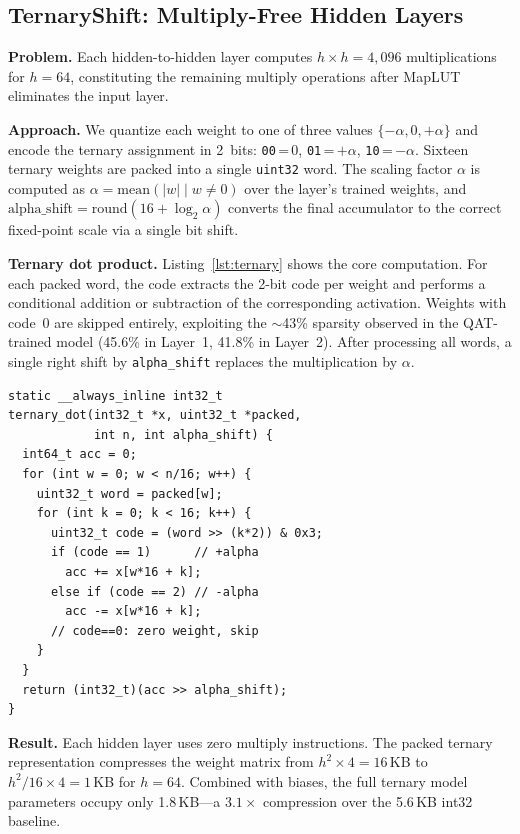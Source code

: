 \documentclass[sigconf,nonacm]{acmart}
\begin{document}
\subsection{TernaryShift: Multiply-Free Hidden Layers}\label{sec:ternary}

\textbf{Problem.}
Each hidden-to-hidden layer computes $h \times h = 4{,}096$
multiplications for $h = 64$, constituting the remaining multiply
operations after MapLUT eliminates the input layer.

\textbf{Approach.}
We quantize each weight to one of three values
$\{-\alpha, 0, +\alpha\}$ and encode the ternary assignment in 2~bits:
\texttt{00}\,=\,0, \texttt{01}\,=\,$+\alpha$,
\texttt{10}\,=\,$-\alpha$.
Sixteen ternary weights are packed into a single \texttt{uint32} word.
The scaling factor $\alpha$ is computed as
$\alpha = \text{mean}(|w| \mid w \neq 0)$ over the layer's trained
weights, and
$\text{alpha\_shift} = \text{round}(16 + \log_2 \alpha)$ converts the
final accumulator to the correct fixed-point scale via a single bit
shift.

\textbf{Ternary dot product.}
Listing~\ref{lst:ternary} shows the core computation.
For each packed word, the code extracts the 2-bit code per weight and
performs a conditional addition or subtraction of the corresponding
activation.
Weights with code~0 are skipped entirely, exploiting the ${\sim}$43\%
sparsity observed in the QAT-trained model (45.6\% in Layer~1, 41.8\%
in Layer~2).
After processing all words, a single right shift by
\texttt{alpha\_shift} replaces the multiplication by $\alpha$.

\begin{lstlisting}[caption={Ternary dot product (simplified).
The inner loop processes 16 packed weights per 32-bit word.},label={lst:ternary},float=t]
static __always_inline int32_t
ternary_dot(int32_t *x, uint32_t *packed,
            int n, int alpha_shift) {
  int64_t acc = 0;
  for (int w = 0; w < n/16; w++) {
    uint32_t word = packed[w];
    for (int k = 0; k < 16; k++) {
      uint32_t code = (word >> (k*2)) & 0x3;
      if (code == 1)      // +alpha
        acc += x[w*16 + k];
      else if (code == 2) // -alpha
        acc -= x[w*16 + k];
      // code==0: zero weight, skip
    }
  }
  return (int32_t)(acc >> alpha_shift);
}
\end{lstlisting}

\textbf{Result.}
Each hidden layer uses zero multiply instructions.
The packed ternary representation compresses the weight matrix from
$h^2 \times 4 = 16$\,KB to $h^2 / 16 \times 4 = 1$\,KB for $h = 64$.
Combined with biases, the full ternary model parameters occupy only
1.8\,KB---a $3.1\times$ compression over the 5.6\,KB int32 baseline.
\end{document}
